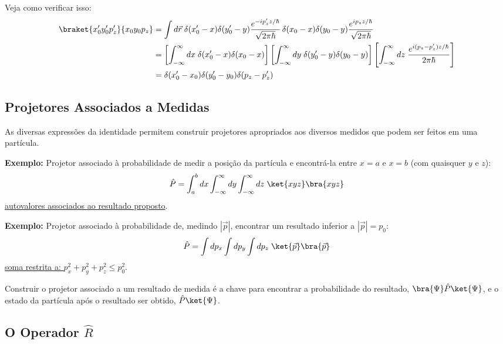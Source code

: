 Veja como verificar isso:
\begin{align}
    \braket{x_0'y_0'p_z'}{x_0y_0p_z} &= \int d\vec{r} \; \delta(x_0'-x)\delta(y_0'-y)\frac{e^{-ip_z'z/\hbar}}{\sqrt{2\pi\hbar}} \, \delta(x_0-x)\delta(y_0-y)\frac{e^{ip_zz/\hbar}}{\sqrt{2\pi\hbar}} \notag \\
    &= \left[\int_{-\infty}^{\infty}dx \; \delta(x_0'-x)\delta(x_0-x)\right]\left[\int_{-\infty}^{\infty}dy \; \delta(y_0'-y)\delta(y_0-y)\right]\left[\int_{-\infty}^{\infty}dz \; \frac{e^{i(p_z-p_z')z/\hbar}}{2\pi\hbar}\right] \notag \\
    &= \delta(x_0'-x_0)\delta(y_0'-y_0)\delta(p_z-p_z')
\label{eq:aula22_verificacao_xypz}
\end{align}

\subsection*{Projetores Associados a Medidas}

As diversas expressões da identidade permitem construir projetores apropriados aos diversos medidos que podem ser feitos em uma partícula.

\textbf{Exemplo:} Projetor associado à probabilidade de medir a posição da partícula e encontrá-la entre $x=a$ e $x=b$ (com quaisquer $y$ e $z$):
\begin{equation}
    \hat{P} = \int_a^b dx \int_{-\infty}^{\infty}dy\int_{-\infty}^{\infty}dz \; \ket{xyz}\bra{xyz}
\label{eq:aula22_projetor_posicao}
\end{equation}
\underline{autovalores associados ao resultado proposto}.

\textbf{Exemplo:} Projetor associado à probabilidade de, medindo $|\vec{p}|$, encontrar um resultado inferior a $|\vec{p}| = p_0$:
\begin{equation}
    \hat{P} = \int dp_x \int dp_y \int dp_z \; \ket{\vec{p}}\bra{\vec{p}}
\label{eq:aula22_projetor_momento}
\end{equation}
\underline{soma restrita a: $p_x^2 + p_y^2 + p_z^2 \le p_0^2$}.

Construir o projetor associado a um resultado de medida é a chave para encontrar a probabilidade do resultado, $\bra{\Psi}\hat{P}\ket{\Psi}$, e o estado da partícula após o resultado ser obtido, $\hat{P}\ket{\Psi}$.


\subsection*{O Operador $\hat{R}$}

